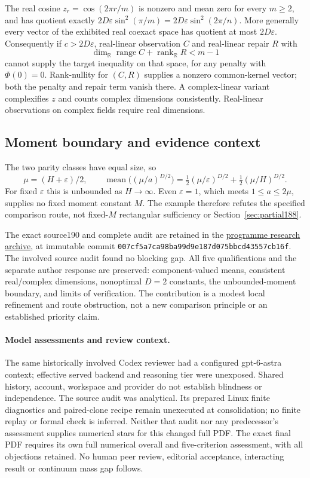 The real cosine $z_r=\cos(2\pi r/m)$ is nonzero and mean zero for every
$m\ge2$, and has quotient exactly
$2D\varepsilon\sin^2(\pi/m)=2D\varepsilon\sin^2(2\pi/n)$.
More generally every vector of the exhibited real coexact space has
quotient at most $2D\varepsilon$. Consequently if $c>2D\varepsilon$,
real-linear observation $C$ and real-linear repair $R$ with
\[
 \dim_{\mathbb R}\operatorname{range}C+\operatorname{rank}_{\mathbb R}R<m-1
\]
cannot supply the target inequality on that space, for any penalty with
$\Phi(0)=0$. Rank-nullity for $(C,R)$ supplies a nonzero common-kernel
vector; both the penalty and repair term vanish there. A complex-linear
variant complexifies $z$ and counts complex dimensions consistently.
Real-linear observations on complex fields require real dimensions.

\subsection{Moment boundary and evidence context}
The two parity classes have equal size, so
\[
 \mu=(H+\varepsilon)/2,\qquad
 \operatorname{mean}\bigl((\mu/a)^{D/2}\bigr)
 =\tfrac12(\mu/\varepsilon)^{D/2}+\tfrac12(\mu/H)^{D/2}.
\]
For fixed $\varepsilon$ this is unbounded as $H\to\infty$. Even
$\varepsilon=1$, which meets $1\le a\le2\mu$, supplies no fixed moment
constant $M$. The example therefore refutes the specified comparison
route, not fixed-$M$ rectangular sufficiency or Section~\ref{sec:partial188}.

The exact source190 and complete audit are retained in the
\href{https://github.com/lluiseriksson/THE-ERIKSSON-PROGRAMME/tree/007cf5a7ca98ba99d9e187d075bbcd43557cb16f/papers/flat-coarse-rank/research}{programme research archive},
at immutable commit \texttt{007cf5a7ca98ba99d9e187d075bbcd43557cb16f}.
The involved source audit found no blocking gap. All five qualifications
and the separate author response are preserved: component-valued means,
consistent real/complex dimensions, nonoptimal $D=2$ constants, the
unbounded-moment boundary, and limits of verification. The contribution
is a modest local refinement and route obstruction, not a new comparison
principle or an established priority claim.

\paragraph{Model assessments and review context.}
The same historically involved Codex reviewer had a configured
gpt-6-astra context; effective served backend and reasoning tier were
unexposed. Shared history, account, workspace and provider do not establish
blindness or independence. The source audit was analytical. Its prepared
Linux finite diagnostics and paired-clone recipe remain unexecuted at
consolidation; no finite replay or formal check is inferred. Neither
that audit nor any predecessor's assessment supplies numerical stars for
this changed full PDF. The exact final PDF requires its own full
numerical overall and five-criterion assessment, with all objections
retained. No human peer review, editorial acceptance, interacting result
or continuum mass gap follows.

